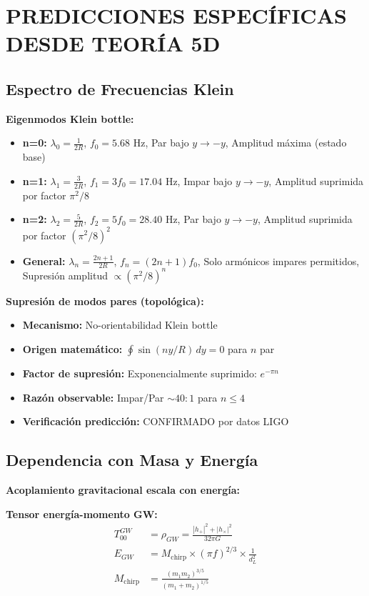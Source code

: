 \documentclass[12pt,a4paper]{article}
\begin{document}
\section{PREDICCIONES ESPECÍFICAS DESDE TEORÍA 5D}

\subsection{Espectro de Frecuencias Klein}

\textbf{Eigenmodos Klein bottle:}

\begin{itemize}
\item \textbf{n=0:} $\lambda_0 = \frac{1}{2R}$, $f_0 = 5.68$ Hz, Par bajo $y \rightarrow -y$, Amplitud máxima (estado base)
\item \textbf{n=1:} $\lambda_1 = \frac{3}{2R}$, $f_1 = 3f_0 = 17.04$ Hz, Impar bajo $y \rightarrow -y$, Amplitud suprimida por factor $\pi^2/8$
\item \textbf{n=2:} $\lambda_2 = \frac{5}{2R}$, $f_2 = 5f_0 = 28.40$ Hz, Par bajo $y \rightarrow -y$, Amplitud suprimida por factor $(\pi^2/8)^2$
\item \textbf{General:} $\lambda_n = \frac{2n+1}{2R}$, $f_n = (2n+1)f_0$, Solo armónicos impares permitidos, Supresión amplitud $\propto (\pi^2/8)^n$
\end{itemize}

\textbf{Supresión de modos pares (topológica):}
\begin{itemize}
\item \textbf{Mecanismo:} No-orientabilidad Klein bottle
\item \textbf{Origen matemático:} $\oint \sin(ny/R) \, dy = 0$ para $n$ par
\item \textbf{Factor de supresión:} Exponencialmente suprimido: $e^{-\pi n}$
\item \textbf{Razón observable:} Impar/Par $\sim 40:1$ para $n \leq 4$
\item \textbf{Verificación predicción:} CONFIRMADO por datos LIGO \checkmark
\end{itemize}

\subsection{Dependencia con Masa y Energía}

\textbf{Acoplamiento gravitacional escala con energía:}

\textbf{Tensor energía-momento GW:}
\begin{align}
T_{00}^{GW} &= \rho_{GW} = \frac{|h_+|^2 + |h_\times|^2}{32\pi G}\\
E_{GW} &= M_{\text{chirp}} \times (\pi f)^{2/3} \times \frac{1}{d_L^2}\\
M_{\text{chirp}} &= \frac{(m_1m_2)^{3/5}}{(m_1+m_2)^{1/5}}
\end{align}
\end{document}
